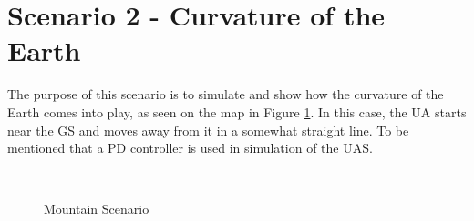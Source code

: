 \newpage
\section{Scenario 2 - Curvature of the Earth}\label{sec:scenario2}
The purpose of this scenario is to simulate and show how the curvature of the Earth comes into play, as seen on the map in Figure \ref{fig:s2_map}. In this case, the UA starts near the GS and moves away from it in a somewhat straight line. To be mentioned that a PD controller is used in simulation of the UAS.

\begin{figure}[H]
	\centering
	\\
	\caption{Mountain Scenario}
	\label{fig:s2_map}
\end{figure}


